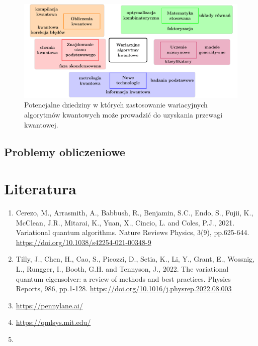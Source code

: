 \documentclass[a4paper,11pt]{article}
\begin{document}
\begin{figure}[ht!]
	\centering
	\includegraphics[width=\textwidth]{vqa-applications-pl}
	\caption{Potencjalne dziedziny w których zastosowanie wariacyjnych algorytmów kwantowych może prowadzić do uzyskania przewagi kwantowej.}
\end{figure}

\hypertarget{matematyczne}{%
	\subsection{Problemy obliczeniowe}\label{matematyczne}}





\newpage 

\hypertarget{literatura}{%
\section*{Literatura}\label{literatura}}

\begin{enumerate}
\def\labelenumi{\arabic{enumi}.}

\item Cerezo, M., Arrasmith, A., Babbush, R., Benjamin, S.C., Endo, S., Fujii, K., McClean, J.R., Mitarai, K., Yuan, X., Cincio, L. and Coles, P.J., 2021. Variational quantum algorithms. Nature Reviews Physics, 3(9), pp.625-644. \url{https://doi.org/10.1038/s42254-021-00348-9}

\item Tilly, J., Chen, H., Cao, S., Picozzi, D., Setia, K., Li, Y., Grant, E., Wossnig, L., Rungger, I., Booth, G.H. and Tennyson, J., 2022. The variational quantum eigensolver: a review of methods and best practices. Physics Reports, 986, pp.1-128. \url{https://doi.org/10.1016/j.physrep.2022.08.003}

\item \url{https://pennylane.ai/}

\item \url{https://qmlsys.mit.edu/}

\item 
\end{enumerate}
\end{document}
